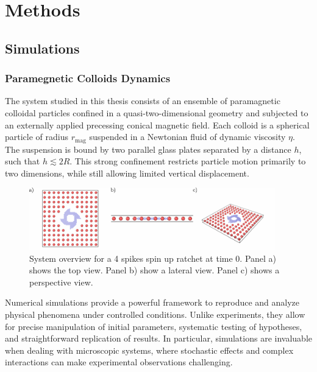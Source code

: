 \part{Methods}
\label{part:methods}

\chapter{Simulations}

\section{Paramegnetic Colloids Dynamics}

The system studied in this thesis consists of an ensemble of paramagnetic colloidal particles confined in a quasi-two-dimensional geometry and subjected to an externally applied precessing conical magnetic field. Each colloid is a spherical particle of radius $r_{\mathrm{mag}}$ suspended in a Newtonian fluid of dynamic viscosity $\eta$. The suspension is bound by two parallel glass plates separated by a distance $h$, such that $h \lesssim 2R$. This strong confinement restricts particle motion primarily to two dimensions, while still allowing limited vertical displacement. 

\begin{figure}
  \begin{center}
    \includegraphics[width=0.95\textwidth]{figures/system.pdf}
  \end{center}
  \caption[System overview.]{System overview for a 4 spikes spin up ratchet at time 0. Panel a) shows the top view. Panel b) show a lateral view. Panel c) shows a perspective view.}\label{fig:system}
\end{figure}



Numerical simulations provide a powerful framework to reproduce and analyze physical phenomena under controlled conditions. Unlike experiments, they allow for precise manipulation of initial parameters, systematic testing of hypotheses, and straightforward replication of results. In particular, simulations are invaluable when dealing with microscopic systems, where stochastic effects and complex interactions can make experimental observations challenging. 


